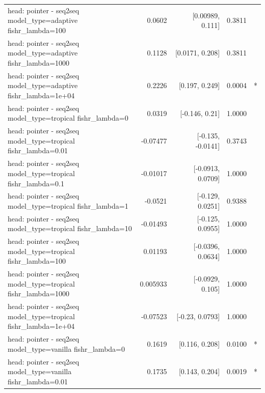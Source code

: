 \documentclass[10pt]{article}
\makeatletter
\newcommand{\stackcell}[1]{\begin{tabular}[t]{@{}l@{}}#1\end{tabular}}
\makeatother
\begin{document}
{\begin{longtable}{lrrrl}
\stackcell{head: pointer - seq2seq\\\footnotesize model\_type=adaptive fishr\_lambda=100 } & 0.0602 & [0.00989, 0.111] & 0.3811 & \\
\stackcell{head: pointer - seq2seq\\\footnotesize model\_type=adaptive fishr\_lambda=1000 } & 0.1128 & [0.0171, 0.208] & 0.3811 & \\
\stackcell{head: pointer - seq2seq\\\footnotesize model\_type=adaptive fishr\_lambda=1e+04 } & 0.2226 & [0.197, 0.249] & 0.0004 & *\\
\stackcell{head: pointer - seq2seq\\\footnotesize model\_type=tropical fishr\_lambda=0 } & 0.0319 & [-0.146, 0.21] & 1.0000 & \\
\stackcell{head: pointer - seq2seq\\\footnotesize model\_type=tropical fishr\_lambda=0.01 } & -0.07477 & [-0.135, -0.0141] & 0.3743 & \\
\stackcell{head: pointer - seq2seq\\\footnotesize model\_type=tropical fishr\_lambda=0.1 } & -0.01017 & [-0.0913, 0.0709] & 1.0000 & \\
\stackcell{head: pointer - seq2seq\\\footnotesize model\_type=tropical fishr\_lambda=1 } & -0.0521 & [-0.129, 0.0251] & 0.9388 & \\
\stackcell{head: pointer - seq2seq\\\footnotesize model\_type=tropical fishr\_lambda=10 } & -0.01493 & [-0.125, 0.0955] & 1.0000 & \\
\stackcell{head: pointer - seq2seq\\\footnotesize model\_type=tropical fishr\_lambda=100 } & 0.01193 & [-0.0396, 0.0634] & 1.0000 & \\
\stackcell{head: pointer - seq2seq\\\footnotesize model\_type=tropical fishr\_lambda=1000 } & 0.005933 & [-0.0929, 0.105] & 1.0000 & \\
\stackcell{head: pointer - seq2seq\\\footnotesize model\_type=tropical fishr\_lambda=1e+04 } & -0.07523 & [-0.23, 0.0793] & 1.0000 & \\
\stackcell{head: pointer - seq2seq\\\footnotesize model\_type=vanilla fishr\_lambda=0 } & 0.1619 & [0.116, 0.208] & 0.0100 & *\\
\stackcell{head: pointer - seq2seq\\\footnotesize model\_type=vanilla fishr\_lambda=0.01 } & 0.1735 & [0.143, 0.204] & 0.0019 & *\\

\end{longtable}}
\end{document}

